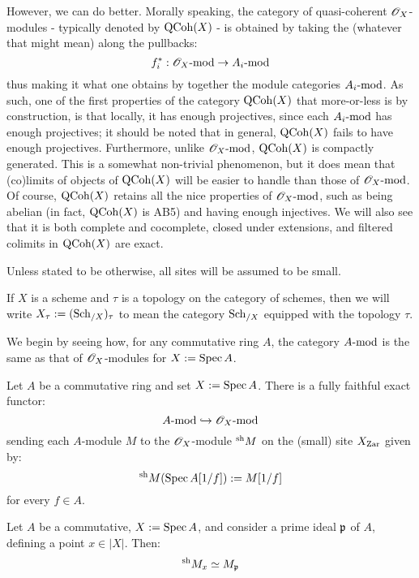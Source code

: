             However, we can do better. Morally speaking, the category of quasi-coherent $\scrO_X$-modules - typically denoted by $\QCoh(X)$ - is obtained by taking the  (whatever that might mean) along the pullbacks:
                $$f^*_i: \scrO_X\mod \to A_i\mod$$
            thus making it what one obtains by  together the module categories $A_i\mod$. As such, one of the first properties of the category $\QCoh(X)$ that more-or-less is by construction, is that locally, it has enough projectives, since each $A_i\mod$ has enough projectives; it should be noted that in general, $\QCoh(X)$ fails to have enough  projectives. Furthermore, unlike $\scrO_X\mod$, $\QCoh(X)$ is compactly generated. This is a somewhat non-trivial phenomenon, but it does mean that (co)limits of objects of $\QCoh(X)$ will be easier to handle than those of $\scrO_X\mod$. Of course, $\QCoh(X)$ retains all the nice properties of $\scrO_X\mod$, such as being abelian (in fact, $\QCoh(X)$ is AB5) and having enough injectives. We will also see that it is both complete and cocomplete, closed under extensions, and filtered colimits in $\QCoh(X)$ are exact.

            \begin{convention}
                Unless stated to be otherwise, all sites will be assumed to be small. 

                If $X$ is a scheme and $\tau$ is a topology on the category of schemes, then we will write $X_{\tau} := (\Sch_{/X})_{\tau}$ to mean the category $\Sch_{/X}$ equipped with the topology $\tau$. 
            \end{convention}

            We begin by seeing how, for any commutative ring $A$, the category $A\mod$ is the same as that of $\scrO_X$-modules for $X := \Spec A$. 
            \begin{lemma} \label{lemma: sheafifying_modules}
                Let $A$ be a commutative ring and set $X := \Spec A$. There is a fully faithful exact functor:
                    $$A\mod \hookrightarrow \scrO_X\mod$$
                sending each $A$-module $M$ to the $\scrO_X$-module ${}^{\sh}M$ on the (small) site $X_{\Zar}$ given by:
                    $${}^{\sh}M(\Spec A[1/f]) := M[1/f]$$
                for every $f \in A$. 
            \end{lemma}
            \begin{corollary}
                Let $A$ be a commutative, $X := \Spec A$, and consider a prime ideal $\p$ of $A$, defining a point $x \in |X|$. Then:
                    $${}^{\sh}M_x \cong M_{\p}$$
            \end{corollary}
            
